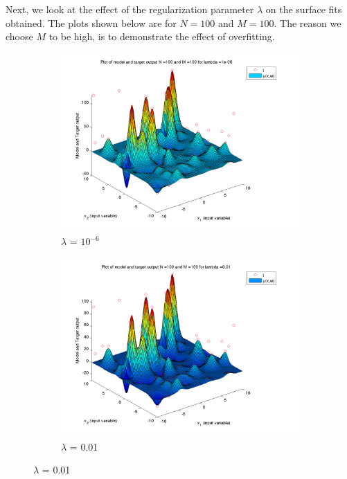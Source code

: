 \documentclass{article}
\begin{document}
\begin{flushleft}
Next, we look at the effect of the regularization parameter $\lambda$ on the surface fits obtained. The plots shown below are for $N = 100$ and $M = 100$. The reason we choose $M$ to be high, is to demonstrate the effect of overfitting.

\end{flushleft}

\begin{figure}[H]

\begin{subfigure}{.5\textwidth}
\centering
\includegraphics[width=\linewidth]{D2/Varyinglambda_N100M100lambda1e-06}
\caption{$\lambda$ = $10^{-6}$}
\end{subfigure}
\begin{subfigure}{.5\textwidth}
\includegraphics[width=\linewidth]{D2/Varyinglambda_N100M100lambda0_01}
\caption{$\lambda$ = 0.01}
\end{subfigure}



\end{figure}
\end{document}
